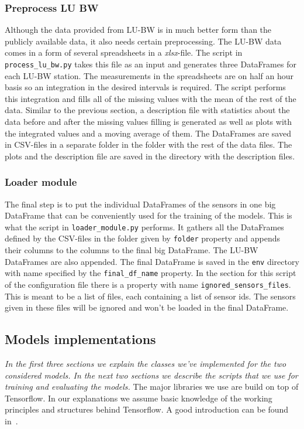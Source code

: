 \documentclass[12pt,a4paper,twoside]{scrartcl}
\numberwithin{equation}{section}
\begin{document}
\subsubsection{Preprocess LU BW}\label{sec:preproc-lu-bw-module}
Although the data provided from LU-BW is in much better form than the publicly available data, it also needs certain preprocessing. The LU-BW data comes in a form of several spreadsheets in a \emph{xlsx}-file. The script in \texttt{process\_lu\_bw.py} takes this file as an input and generates three DataFrames for each LU-BW station. The measurements in the spreadsheets are on half an hour basis so an integration in the desired intervals is required. The script performs this integration and fills all of the missing values with the mean of the rest of the data. Similar to the previous section, a description file with statistics about the data before and after the missing values filling is generated as well as plots with the integrated values and a moving average of them. The DataFrames are saved in CSV-files in a separate folder in the folder with the rest of the data files. The plots and the description file are saved in the directory with the description files.
\subsubsection{Loader module}\label{sec:load-module}
The final step is to put the individual DataFrames of the sensors in one big DataFrame that can be conveniently used for the training of the models. This is what the script in \texttt{loader\_module.py} performs. It gathers all the DataFrames defined by the CSV-files in the folder given by \texttt{folder} property and appends their columns to the columns to the final big DataFrame. The LU-BW DataFrames are also appended. The final DataFrame is saved in the \texttt{env} directory with name specified by the \texttt{final\_df\_name} property. In the section for this script of the configuration file there is a property with name \texttt{ignored\_sensors\_files}. This is meant to be a list of files, each containing a list of sensor ids. The sensors given in these files will be ignored and won't be loaded in the final DataFrame.
\subsection{Models implementations}\label{sec:impl-model}
\noindent\emph{In the first three sections we explain the classes we've implemented for the two considered models. In the next two sections we describe the scripts that we use for training and evaluating the models.}
The major libraries we use are build on top of Tensorflow. In our explanations we assume basic knowledge of the working principles and structures behind Tensorflow. A good introduction can be found in~\cite{tfnintro}.
\end{document}
